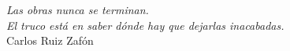 \thispagestyle{empty}

\vspace*{\fill}
\begin{flushright}
\textit{Las obras nunca se terminan.\\ El truco est\'a en saber d\'onde hay que dejarlas inacabadas.} \\
\vspace{0.05in}
Carlos Ruiz Zaf\'on
\end{flushright}
\vspace*{\fill}
